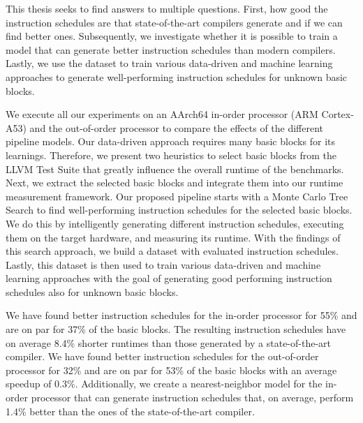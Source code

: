 
This thesis seeks to find answers to multiple questions.
First, how good the instruction schedules are that state-of-the-art compilers generate and if we can find better ones.
Subsequently, we investigate whether it is possible to train a model that can generate better instruction schedules than modern compilers.
Lastly, we use the dataset to train various data-driven and machine learning approaches to generate well-performing instruction schedules for unknown basic blocks.


We execute all our experiments on an AArch64 in-order processor (ARM Cortex-A53) and the \aurora out-of-order processor to compare the effects of the different pipeline models.
Our data-driven approach requires many basic blocks for its learnings.
Therefore, we present two heuristics to select basic blocks from the LLVM Test Suite that greatly influence the overall runtime of the benchmarks.
Next, we extract the selected basic blocks and integrate them into our runtime measurement framework.
Our proposed pipeline starts with a Monte Carlo Tree Search to find well-performing instruction schedules for the selected basic blocks.
We do this by intelligently generating different instruction schedules, executing them on the target hardware, and measuring its runtime.
With the findings of this search approach, we build a dataset with evaluated instruction schedules.
Lastly, this dataset is then used to train various data-driven and machine learning approaches with the goal of generating good performing instruction schedules also for unknown basic blocks.

We have found better instruction schedules for the in-order processor for 55\% and are on par for 37\% of the basic blocks.
The resulting instruction schedules have on average 8.4\% shorter runtimes than those generated by a state-of-the-art compiler.
We have found better instruction schedules for the out-of-order processor for 32\% and are on par for 53\% of the basic blocks with an average speedup of 0.3\%.
Additionally, we create a nearest-neighbor model for the in-order processor that can generate instruction schedules that, on average, perform 1.4\% better than the ones of the state-of-the-art compiler.

